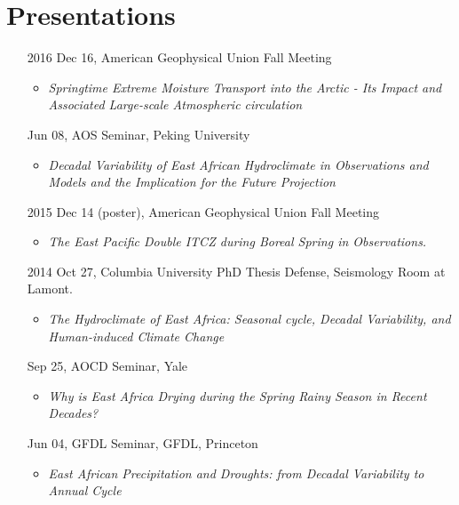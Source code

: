 \documentclass[11pt]{article}
\newcommand{\meetingName}[1]{#1}
\newcommand{\ptitle}[1]{\textit{#1}}
\begin{document}
\section{Presentations}
\begin{itemize}[leftmargin=10ex]
    \item[2016]Dec 16, \meetingName{American Geophysical Union Fall Meeting}
    \begin{itemize}[leftmargin=4ex]
		\item \ptitle{Springtime Extreme Moisture Transport into the Arctic - Its Impact and Associated Large-scale Atmospheric circulation}
		\end{itemize}

	\item[\phantom{2016}] Jun 08, \meetingName{AOS Seminar}, Peking University
	\begin{itemize}[leftmargin=4ex]
		\item \ptitle{Decadal Variability of East African Hydroclimate in Observations and Models and the Implication for the Future Projection}
		\end{itemize}
	
	\item[2015]Dec 14 (poster),  \meetingName{American Geophysical Union Fall Meeting}
	\begin{itemize}[leftmargin=4ex]
		\item \ptitle{The East Pacific Double ITCZ during Boreal Spring in Observations.}
		\end{itemize}
	
	\item [2014] Oct 27,  \meetingName{Columbia University PhD Thesis Defense}, Seismology Room at Lamont.
	\begin{itemize}[leftmargin=4ex]
		\item \ptitle{The Hydroclimate of East Africa: Seasonal cycle, Decadal Variability, and Human-induced Climate Change}
		\end{itemize}
	
	\item[\phantom{2014}] Sep 25, \meetingName{AOCD Seminar}, Yale
	 \begin{itemize}[leftmargin=4ex]
		\item \ptitle{Why is East Africa Drying during the Spring Rainy Season in Recent Decades?}
		\end{itemize}

	\item [\phantom{2014}]Jun 04,  \meetingName{GFDL Seminar},  GFDL, Princeton
	 \begin{itemize}[leftmargin=4ex]
		\item \ptitle{East African Precipitation and Droughts: from Decadal Variability to Annual Cycle}
		\end{itemize}


\end{itemize}
\end{document}
